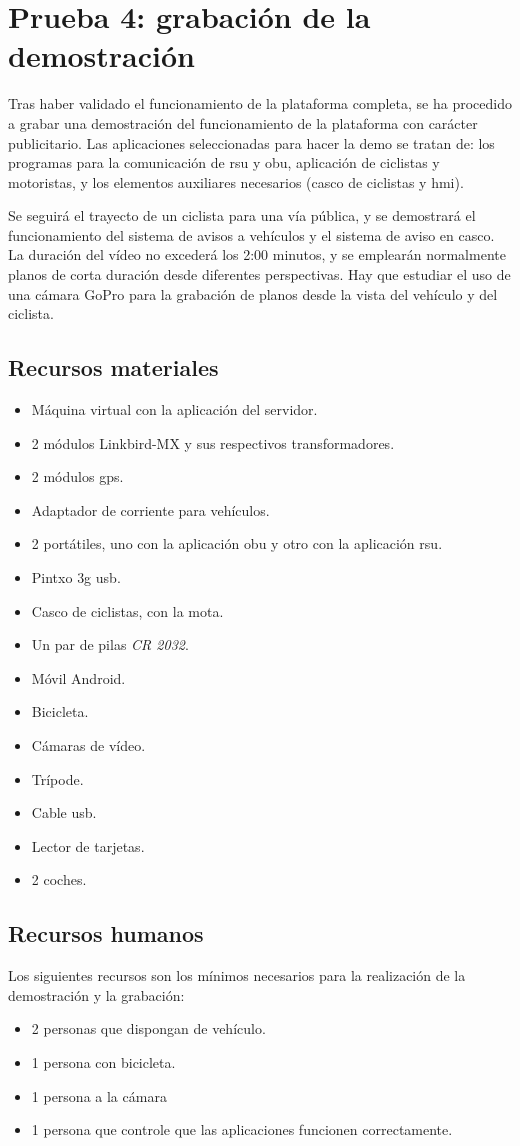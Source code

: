 \section{Prueba 4: grabación de la demostración}
Tras haber validado el funcionamiento de la plataforma completa, se ha
procedido a grabar una demostración del funcionamiento de la plataforma con
carácter publicitario. Las aplicaciones seleccionadas para hacer la demo se
tratan de: los programas para la comunicación de \gls{rsu} y \gls{obu},
aplicación de ciclistas y motoristas, y los elementos auxiliares necesarios
(casco de ciclistas y \gls{hmi}).

Se seguirá el trayecto de un ciclista para una vía pública, y se demostrará el
funcionamiento del sistema de avisos a vehículos y el sistema de aviso en
casco. La duración del vídeo no excederá los 2:00 minutos, y se emplearán
normalmente planos de corta duración desde diferentes perspectivas. Hay que
estudiar el uso de una cámara GoPro para la grabación de planos desde la vista
del vehículo y del ciclista.

\subsection{Recursos materiales}
\begin{itemize}
	\item Máquina virtual con la aplicación del servidor.
	\item 2 módulos Linkbird-MX y sus respectivos transformadores.
	\item 2 módulos \gls{gps}.
	\item Adaptador de corriente para vehículos.
	\item 2 portátiles, uno con la aplicación \gls{obu} y otro con la
	aplicación \gls{rsu}.
	\item Pintxo \gls{3g} \gls{usb}.
	\item Casco de ciclistas, con la mota.
	\item Un par de pilas \emph{CR 2032}.
	\item Móvil Android.
	\item Bicicleta.
	\item Cámaras de vídeo.
	\item Trípode.
	\item Cable \gls{usb}.
	\item Lector de tarjetas.
	\item 2 coches.
\end{itemize}

\subsection{Recursos humanos}
Los siguientes recursos son los mínimos necesarios para la realización de
la demostración y la grabación:
\begin{itemize}
	\item 2 personas que dispongan de vehículo.
	\item 1 persona con bicicleta.
	\item 1 persona a la cámara
	\item 1 persona que controle que las aplicaciones funcionen correctamente.
\end{itemize}

